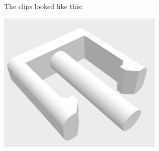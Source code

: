 \documentclass{scrartcl}
\begin{document}
The clips looked like this:

\includegraphics[width=3.125000in, keepaspectratio=true]{./Second_Wheel_Holder/clip_9.png}
\end{document}
